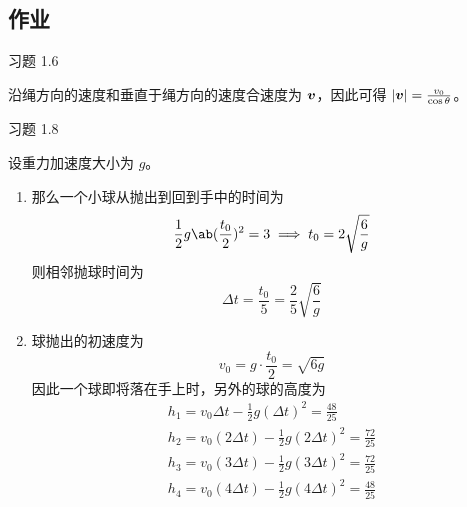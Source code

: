 \subsection{作业}

\begin{problem}
    习题 1.6
    \begin{solution}
        沿绳方向的速度和垂直于绳方向的速度合速度为 $\boldsymbol{v}$，因此可得 $|\boldsymbol{v}| = \frac{v_0}{\cos \theta}$。
    \end{solution}
\end{problem}

\begin{problem}
    习题 1.8
    \begin{solution}
        设重力加速度大小为 $g$。
        \begin{enumerate}
            \item[\textbf{1)}] 那么一个小球从抛出到回到手中的时间为
            $$
            \frac{1}{2} g \ab(\frac{t_0}{2})^2 = 3 \implies t_0 = 2 \sqrt{\frac{6}{g}}
            $$
            则相邻抛球时间为
            $$
            \Delta t = \frac{t_0}{5} = \frac{2}{5} \sqrt{\frac{6}{g}}
            $$
            
            \item[\textbf{2）}] 球抛出的初速度为
            $$
            v_0 = g \cdot \frac{t_0}{2} = \sqrt{6 g}
            $$
            因此一个球即将落在手上时，另外的球的高度为
            $$
            \begin{gathered}
                h_1 = v_0 \Delta t - \frac{1}{2} g (\Delta t)^2 = \frac{48}{25} \\
                h_2 = v_0 (2 \Delta t) - \frac{1}{2} g (2 \Delta t)^2 = \frac{72}{25} \\
                h_3 = v_0 (3 \Delta t) - \frac{1}{2} g (3 \Delta t)^2 = \frac{72}{25} \\
                h_4 = v_0 (4 \Delta t) - \frac{1}{2} g (4 \Delta t)^2 = \frac{48}{25} \\
            \end{gathered}
            $$

        \end{enumerate}
    \end{solution}
\end{problem}

